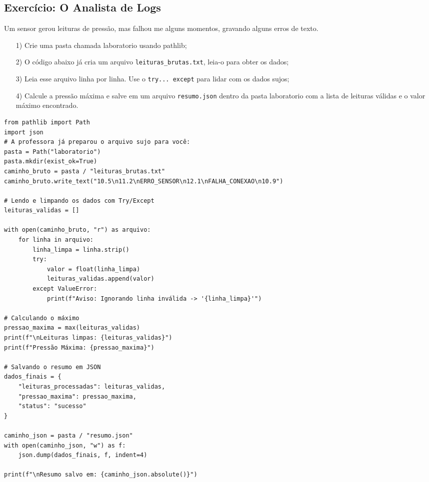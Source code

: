 \documentclass[../numerical_methods.tex]{subfiles}
\begin{document}
\subsection{Exercício: O Analista de Logs}
Um sensor gerou leituras de pressão, mas falhou me alguns momentos, gravando alguns erros de texto.
\begin{itemize}
	\item[1)] Crie uma pasta chamada laboratorio usando pathlib;
	\item[2)] O código abaixo já cria um arquivo \texttt{leituras\_brutas.txt}, leia-o para obter os dados;
	\item[3)] Leia esse arquivo linha por linha. Use o \texttt{try... except} para lidar com os dados sujos;
	\item[4)] Calcule a pressão máxima e salve em um arquivo \texttt{resumo.json} dentro da pasta laboratorio com a lista de leituras válidas e o valor máximo encontrado.
\end{itemize}

\begin{listing}[H]
	\begin{verbatim}
from pathlib import Path
import json
# A professora já preparou o arquivo sujo para você:
pasta = Path("laboratorio")
pasta.mkdir(exist_ok=True)
caminho_bruto = pasta / "leituras_brutas.txt"
caminho_bruto.write_text("10.5\n11.2\nERRO_SENSOR\n12.1\nFALHA_CONEXAO\n10.9")

# Lendo e limpando os dados com Try/Except
leituras_validas = []

with open(caminho_bruto, "r") as arquivo:
    for linha in arquivo:
        linha_limpa = linha.strip()
        try:
            valor = float(linha_limpa)
            leituras_validas.append(valor)
        except ValueError:
            print(f"Aviso: Ignorando linha inválida -> '{linha_limpa}'")

# Calculando o máximo
pressao_maxima = max(leituras_validas)
print(f"\nLeituras limpas: {leituras_validas}")
print(f"Pressão Máxima: {pressao_maxima}")

# Salvando o resumo em JSON
dados_finais = {
    "leituras_processadas": leituras_validas,
    "pressao_maxima": pressao_maxima,
    "status": "sucesso"
}

caminho_json = pasta / "resumo.json"
with open(caminho_json, "w") as f:
    json.dump(dados_finais, f, indent=4)

print(f"\nResumo salvo em: {caminho_json.absolute()}")
\end{verbatim}
\end{listing}
\end{document}

